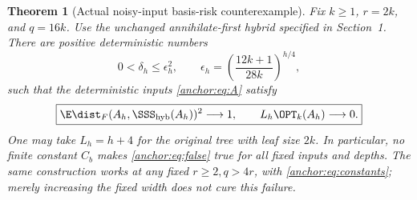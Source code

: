 \documentclass[11pt,oneside,openany,a4paper]{book}
\numberwithin{equation}{chapter}
\newtheorem{theorem}{Theorem}[chapter]
\theoremstyle{definition}
\theoremstyle{remark}
\begin{document}
\begin{theorem}[Actual noisy-input basis-risk counterexample]\label{anchor:thm:main}
Fix $k\ge1$, $r=2k$, and $q=16k$. Use the unchanged annihilate-first hybrid specified in Section~1. There are positive deterministic numbers
\[
 0<\delta_h\le\epsilon_h^2,\qquad
 \epsilon_h=\left(\frac{12k+1}{28k}\right)^{h/4},
\]
such that the deterministic inputs \eqref{anchor:eq:A} satisfy
\begin{equation}\label{anchor:eq:main}
 \boxed{\E\dist_F(A_h,\SSS_{\rm hyb}(A_h))^2\longrightarrow1,\qquad
        L_h\OPT_k(A_h)\longrightarrow0.}
\end{equation}
One may take $L_h=h+4$ for the original tree with leaf size $2k$. In particular, no finite constant $C_b$ makes \eqref{anchor:eq:false} true for all fixed inputs and depths. The same construction works at any fixed $r\ge2,q>4r$, with \eqref{anchor:eq:constants}; merely increasing the fixed width does not cure this failure.
\end{theorem}
\end{document}

